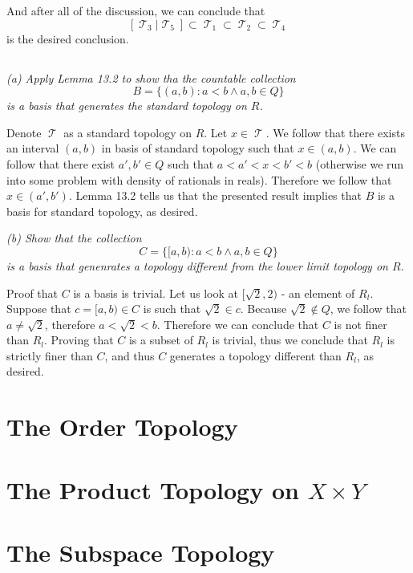 \documentclass[11pt,oneside,titlepage]{book}
\DeclareMathOperator \topol {\mathcal {T}}
\newcommand{\set}[1]{\{ #1 \}}
\begin{document}
And after all of the discussion, we can conclude that
$$[\topol_3 | \topol_5] \subset \topol_1 \subset \topol_2 \subset \topol_4$$
is the desired conclusion.

\subsection{}

\textit{(a) Apply Lemma 13.2 to show tha the countable collection
  $$B = \set{(a, b): a < b \land a, b \in Q}$$
  is a basis that generates the standard topology on $R$.}

Denote $\topol$ as a standard topology on $R$. Let $x \in \topol$. We follow that
there exists an interval $(a, b)$ in basis of standard topology such that
$x \in (a, b)$. We can follow that there exist $a', b' \in Q$ such that
$a < a' < x < b' < b$ (otherwise we run into some problem with density of rationals
in reals). Therefore we follow that $x \in (a', b')$. Lemma 13.2 tells us that
the presented result implies that $B$ is a basis for standard topology, as desired.

\textit{(b) Show that the collection
  $$C = \set{[a, b): a < b \land a, b \in Q}$$
  is a basis that genenrates a topology different from the lower limit topology on $R$.}

Proof that $C$ is a basis is trivial.
Let us look at $[\sqrt{2}, 2)$ - an element of $R_l$. Suppose that $c = [a, b) \in C$ is
such that $\sqrt{2} \in c$. Because $\sqrt{2} \notin Q$, we follow that
$a \neq \sqrt{2}$, therefore $a < \sqrt{2} < b$. Therefore we can conclude that $C$ is
not finer than $R_l$. Proving that $C$ is a subset of $R_l$ is trivial, thus
we conclude that $R_l$ is strictly finer than $C$, and thus $C$ generates a topology
different than $R_l$, as desired.

\section{The Order Topology}

\section{The Product Topology on $X \times Y$}

\section{The Subspace Topology}

\subsection{}
\end{document}
